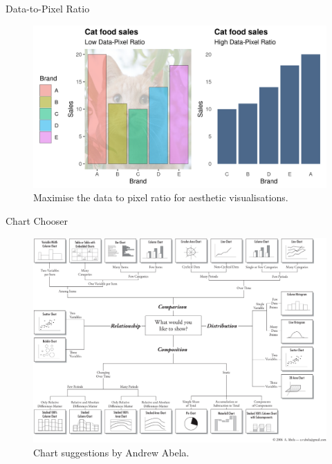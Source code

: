 \documentclass[
  ignorenonframetext,
]{beamer}
\begin{document}
\begin{frame}{Data-to-Pixel Ratio}
\protect\hypertarget{data-to-pixel-ratio}{}
\begin{figure}
\centering
\includegraphics{../manuscript/resources/06_visualisation/data-pixel-ratio.png}
\caption{Maximise the data to pixel ratio for aesthetic visualisations.}
\end{figure}
\end{frame}

\begin{frame}{Chart Chooser}
\protect\hypertarget{chart-chooser}{}
\begin{figure}
\centering
\includegraphics{images/chart_chooser.png}
\caption{Chart suggestions by Andrew Abela.}
\end{figure}
\end{frame}
\end{document}
